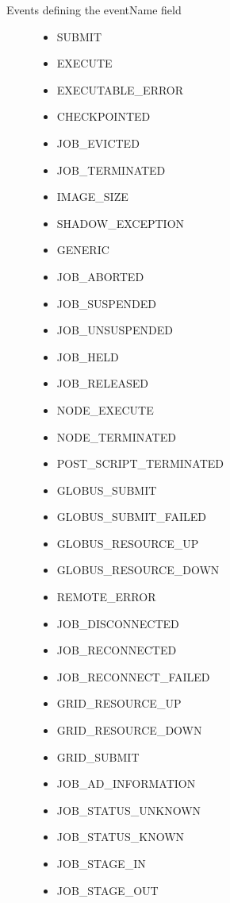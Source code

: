 \begin{description}
\item[Events defining the eventName field]

\begin{itemize}
\item SUBMIT
\item EXECUTE
\item EXECUTABLE\_ERROR
\item CHECKPOINTED
\item JOB\_EVICTED
\item JOB\_TERMINATED
\item IMAGE\_SIZE
\item SHADOW\_EXCEPTION
\item GENERIC
\item JOB\_ABORTED
\item JOB\_SUSPENDED
\item JOB\_UNSUSPENDED
\item JOB\_HELD
\item JOB\_RELEASED
\item NODE\_EXECUTE
\item NODE\_TERMINATED
\item POST\_SCRIPT\_TERMINATED
\item GLOBUS\_SUBMIT
\item GLOBUS\_SUBMIT\_FAILED
\item GLOBUS\_RESOURCE\_UP
\item GLOBUS\_RESOURCE\_DOWN
\item REMOTE\_ERROR
\item JOB\_DISCONNECTED
\item JOB\_RECONNECTED
\item JOB\_RECONNECT\_FAILED
\item GRID\_RESOURCE\_UP
\item GRID\_RESOURCE\_DOWN
\item GRID\_SUBMIT
\item JOB\_AD\_INFORMATION
\item JOB\_STATUS\_UNKNOWN
\item JOB\_STATUS\_KNOWN
\item JOB\_STAGE\_IN
\item JOB\_STAGE\_OUT
\end{itemize}


\end{description}
